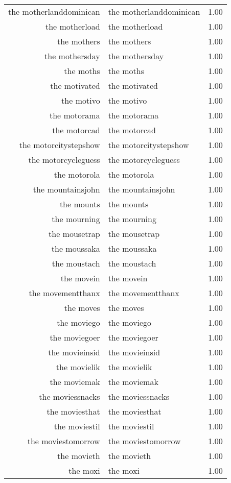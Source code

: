 \begin{table}[ht]
\begin{tabular}{rlr}
  the motherlanddominican & the motherlanddominican & 1.00 \\ 
  the motherload & the motherload & 1.00 \\ 
  the mothers & the mothers & 1.00 \\ 
  the mothersday & the mothersday & 1.00 \\ 
  the moths & the moths & 1.00 \\ 
  the motivated & the motivated & 1.00 \\ 
  the motivo & the motivo & 1.00 \\ 
  the motorama & the motorama & 1.00 \\ 
  the motorcad & the motorcad & 1.00 \\ 
  the motorcitystepshow & the motorcitystepshow & 1.00 \\ 
  the motorcycleguess & the motorcycleguess & 1.00 \\ 
  the motorola & the motorola & 1.00 \\ 
  the mountainsjohn & the mountainsjohn & 1.00 \\ 
  the mounts & the mounts & 1.00 \\ 
  the mourning & the mourning & 1.00 \\ 
  the mousetrap & the mousetrap & 1.00 \\ 
  the moussaka & the moussaka & 1.00 \\ 
  the moustach & the moustach & 1.00 \\ 
  the movein & the movein & 1.00 \\ 
  the movementthanx & the movementthanx & 1.00 \\ 
  the moves & the moves & 1.00 \\ 
  the moviego & the moviego & 1.00 \\ 
  the moviegoer & the moviegoer & 1.00 \\ 
  the movieinsid & the movieinsid & 1.00 \\ 
  the movielik & the movielik & 1.00 \\ 
  the moviemak & the moviemak & 1.00 \\ 
  the moviessnacks & the moviessnacks & 1.00 \\ 
  the moviesthat & the moviesthat & 1.00 \\ 
  the moviestil & the moviestil & 1.00 \\ 
  the moviestomorrow & the moviestomorrow & 1.00 \\ 
  the movieth & the movieth & 1.00 \\ 
  the moxi & the moxi & 1.00 \\ 

\end{tabular}
\end{table}
